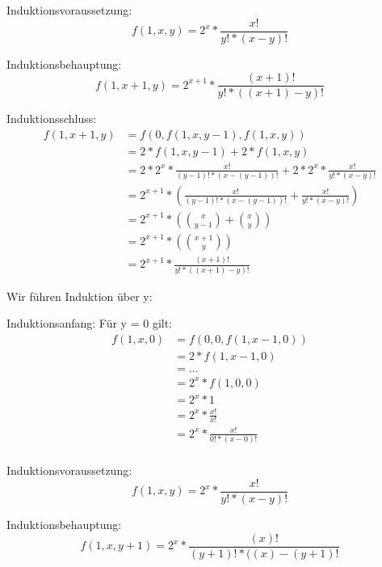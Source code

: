 \documentclass[10pt,leqno ]{article}
\begin{document}
Induktionsvoraussetzung:
\begin{equation*}
f(1,x,y) = 2^x * \frac{x!}{y! * (x - y)!}
\end{equation*}

Induktionsbehauptung:
\begin{equation*}
f(1,x+1,y) = 2^{x+1} * \frac{(x+1)!}{y! * ((x+1) - y)!}
\end{equation*}

Induktionsschluss:
\begin{align*}
f(1,x+1,y) &= f(0, f(1,x,y-1), f(1,x,y)) \\
           &= 2 * f(1,x,y-1) + 2 * f(1,x,y) \\
           &= 2 * 2^x * \frac{x!}{(y-1)! * (x - (y-1))!} + 2 * 2^x * \frac{x!}{y! * (x - y)!} \\ %
           &= 2^{x+1} * (\frac{x!}{(y-1)! * (x - (y-1))!} + \frac{x!}{y! * (x - y)!}) \\
           &= 2^{x+1} * ( \binom{x}{y-1} + \binom{x}{y}) \\
           &= 2^{x+1} * ( \binom{x+1}{y}) \\
           &= 2^{x+1} * \frac{(x+1)!}{y! * ((x+1) - y)!}
\end{align*}

\begin{flushleft}
    Wir führen Induktion über y:
\end{flushleft}

Induktionsanfang:
Für y = 0 gilt:
\begin{align*}
f(1,x,0) &= f(0, 0, f(1, x-1, 0)) \\
         &= 2*f(1,x-1,0) \\
         &= ... \\
         &= 2^x * f(1,0,0) \\
         &= 2^x * 1 \\
         &= 2^x * \frac{x!}{x!} \\
         &= 2^x * \frac{x!}{0! * (x-0)!} \\
\end{align*}

Induktionsvoraussetzung:
\begin{equation*}
f(1,x,y) = 2^x * \frac{x!}{y! * (x - y)!}
\end{equation*}

Induktionsbehauptung:
\begin{equation*}
f(1,x,y+1) = 2^{x} * \frac{(x)!}{(y+1)! * ((x) - (y+1)!}
\end{equation*}
\end{document}
